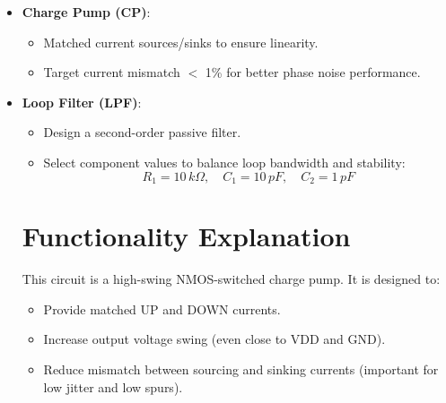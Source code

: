 \begin{itemize}
Example at 3.2\,GHz:

\[
P_{\text{gate}} \approx 10\,\text{fF} \times (1)^2 \times 3.2\,\text{GHz} = 32\,\mu\text{W} \quad (\text{per gate})
\]

For the whole PFD ($\sim$20 gates), total:

\[
P_{\text{PFD}} \approx 0.6\,\text{mW}
\]

    \item \textbf{Charge Pump (CP)}:
    \begin{itemize}
        \item Matched current sources/sinks to ensure linearity.
        \item Target current mismatch $<$ 1\% for better phase noise performance.
    \end{itemize}

    \item \textbf{Loop Filter (LPF)}:
    \begin{itemize}
        \item Design a second-order passive filter.
        \item Select component values to balance loop bandwidth and stability:
        \[
        R_1 = 10\,k\Omega,\quad C_1 = 10\,pF,\quad C_2 = 1\,pF
        \]
    \end{itemize}
\section{Functionality Explanation}
This circuit is a high-swing NMOS-switched charge pump. It is designed to:
\begin{itemize}
    \item Provide matched UP and DOWN currents.
    \item Increase output voltage swing (even close to VDD and GND).
    \item Reduce mismatch between sourcing and sinking currents (important for low jitter and low spurs).
\end{itemize}


\end{itemize}
